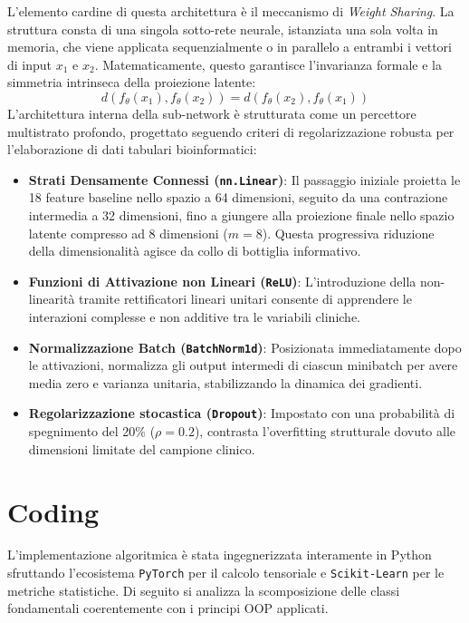 \documentclass{article}
\begin{document}
L'elemento cardine di questa architettura è il meccanismo di \textit{Weight Sharing}. La struttura consta di una singola sotto-rete neurale, istanziata una sola volta in memoria, che viene applicata sequenzialmente o in parallelo a entrambi i vettori di input $x_1$ e $x_2$. Matematicamente, questo garantisce l'invarianza formale e la simmetria intrinseca della proiezione latente:
$$
d(f_{\theta}(x_1), f_{\theta}(x_2)) = d(f_{\theta}(x_2), f_{\theta}(x_1))
$$
L'architettura interna della sub-network è strutturata come un percettore multistrato profondo, progettato seguendo criteri di regolarizzazione robusta per l'elaborazione di dati tabulari bioinformatici:
\begin{itemize}
    \item \textbf{Strati Densamente Connessi (\texttt{nn.Linear})}: Il passaggio iniziale proietta le 18 feature baseline nello spazio a 64 dimensioni, seguito da una contrazione intermedia a 32 dimensioni, fino a giungere alla proiezione finale nello spazio latente compresso ad 8 dimensioni ($m=8$). Questa progressiva riduzione della dimensionalità agisce da collo di bottiglia informativo.
    \item \textbf{Funzioni di Attivazione non Lineari (\texttt{ReLU})}: L'introduzione della non-linearità tramite rettificatori lineari unitari consente di apprendere le interazioni complesse e non additive tra le variabili cliniche.
    \item \textbf{Normalizzazione Batch (\texttt{BatchNorm1d})}: Posizionata immediatamente dopo le attivazioni, normalizza gli output intermedi di ciascun minibatch per avere media zero e varianza unitaria, stabilizzando la dinamica dei gradienti.
    \item \textbf{Regolarizzazione stocastica (\texttt{Dropout})}: Impostato con una probabilità di spegnimento del 20\% ($\rho = 0.2$), contrasta l'overfitting strutturale dovuto alle dimensioni limitate del campione clinico.
\end{itemize}

\section{Coding}
L'implementazione algoritmica è stata ingegnerizzata interamente in Python sfruttando l'ecosistema \texttt{PyTorch} per il calcolo tensoriale e \texttt{Scikit-Learn} per le metriche statistiche. Di seguito si analizza la scomposizione delle classi fondamentali coerentemente con i principi OOP applicati.
\end{document}
